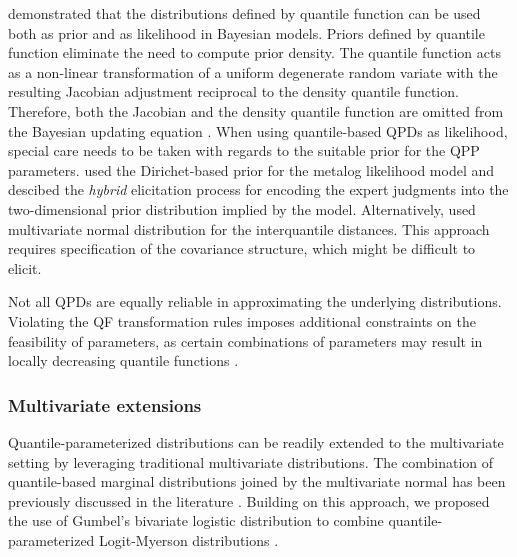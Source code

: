 \documentclass[
  fleqn,
  deca,
  blindrev
]{informs4}
\begin{document}
\citet{perepolkin2023TenetsQuantilebasedInference} demonstrated that the
distributions defined by quantile function can be used both as prior and
as likelihood in Bayesian models. Priors defined by quantile function
eliminate the need to compute prior density. The quantile function acts
as a non-linear transformation of a uniform degenerate random variate
with the resulting Jacobian adjustment reciprocal to the density
quantile function. Therefore, both the Jacobian and the density quantile
function are omitted from the Bayesian updating equation
\citep{perepolkin2023TenetsQuantilebasedInference}. When using
quantile-based QPDs as likelihood, special care needs to be taken with
regards to the suitable prior for the QPP parameters.
\citet{perepolkin2024HybridElicitationQuantileparametrized} used the
Dirichet-based prior for the metalog likelihood model and descibed the
\emph{hybrid} elicitation process for encoding the expert judgments into
the two-dimensional prior distribution implied by the model.
Alternatively, \citet{wilson2023ReconciliationExpertPriors} used
multivariate normal distribution for the interquantile distances. This
approach requires specification of the covariance structure, which might
be difficult to elicit.

Not all QPDs are equally reliable in approximating the underlying
distributions. Violating the QF transformation rules imposes additional
constraints on the feasibility of parameters, as certain combinations of
parameters may result in locally decreasing quantile functions
\citep{keelin2016MetalogDistributions, hadlock2017QuantileparameterizedMethodsQuantifying}.

\subsubsection*{Multivariate extensions}\label{multivariate-extensions}

Quantile-parameterized distributions can be readily extended to the
multivariate setting by leveraging traditional multivariate
distributions. The combination of quantile-based marginal distributions
joined by the multivariate normal has been previously discussed in the
literature
\citep{drovandi2011LikelihoodfreeBayesianEstimation, hoff2007ExtendingRankLikelihood}.
Building on this approach, we proposed the use of Gumbel's bivariate
logistic distribution \citep{gumbel1961BivariateLogisticDistributions}
to combine quantile-parameterized Logit-Myerson distributions
\citep{wilson2023ReconciliationExpertPriors}.
\end{document}
